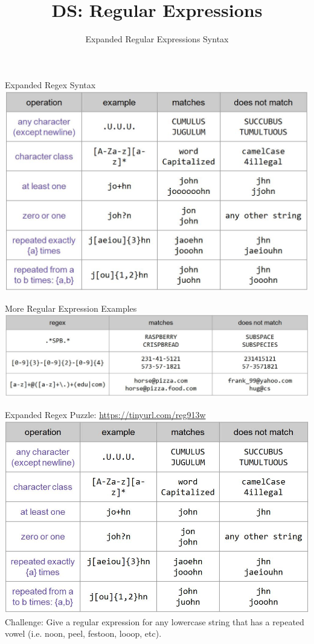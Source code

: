 \documentclass[aspectratio=169]{../latex_main/tntbeamer}  %
\title[Introduction]{DS: Regular Expressions}
\subtitle{Expanded Regular Expressions Syntax}
\begin{document}
	
	\maketitle
	\begin{frame}{Expanded Regex Syntax}
	    \includegraphics[scale=.38]{Bild11}
	\end{frame}
	
	\begin{frame}{More Regular Expression Examples}
	    \includegraphics[scale=.38]{Bild12}
	\end{frame}
	
	
	
	\begin{frame}{Expanded Regex Puzzle: \url{https://tinyurl.com/reg913w}}
	    \includegraphics[scale=.33]{Bild13}\\
	    Challenge: Give a regular expression for any lowercase string thathas a repeated vowel (i.e. noon, peel, festoon, looop, etc).

	\end{frame}
	
\end{document}
